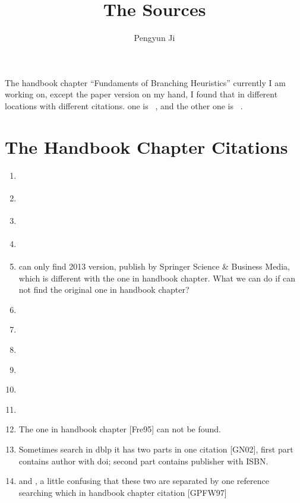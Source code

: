 \documentclass[11pt]{article}
\begin{document}
\title{The Sources}
\author{Pengyun Ji}
\maketitle

 The handbook chapter ``Fundaments of Branching Heuristics'' currently I am working on, except the paper version on my hand, I found that in different locations with different citations. one is ~\cite{kullmann2009fundaments}, and the other one is ~\cite{DBLP:series/faia/Kullmann09}.


\begin{comment}
The one ~\cite{kullmann2009fundaments} is found on google scholar, the one ~\cite{DBLP:series/faia/Kullmann09} is found on dblp.
Not know which citation can be officially used in paper.
\end{comment}


\section{The Handbook Chapter Citations}

\begin{comment}
Here I enter into the references in the handbook chapter.
But the formats of references are different due to using different searching engines.
Some links of the article can be open but some can not since it needs to buy. The question is same as beginning: which are offical in general paper/article?
\end{comment}

\begin{enumerate}
\item \cite{andrew1983handbook}
\item \cite{DBLP:conf/sat/BjesseKDSZ03}
\item \cite{beame2004towards}
\item \cite{DBLP:journals/rsa/BraunsteinMZ05}
\item \cite{bullen2013handbook} can only find 2013 version, publish by Springer Science \& Business Media, which is different with the one in handbook chapter. What we can do if can not find the original one in handbook chapter?
\item \cite{cull2005difference}
\item \cite{dubois1993sat}
\item \cite{DBLP:journals/talg/Eppstein06}
\item \cite{DBLP:conf/sat/EenS03}
\item \cite{DBLP:journals/eatcs/FominGK05}
\item \cite{DBLP:journals/jucs/FrancoKSWDV04}
\item The one in handbook chapter [Fre95] can not be found.
\item \cite{DBLP:conf/date/GoldbergN02} Sometimes search in dblp it has two parts in one citation [GN02], first part contains author with doi; second part contains publisher with ISBN.
\item \cite{gu1996algorithms} and \cite{du1997satisfiability}, a little confusing that these two are separated by one reference searching which in handbook chapter citation [GPFW97]
\end{enumerate}
\end{document}
